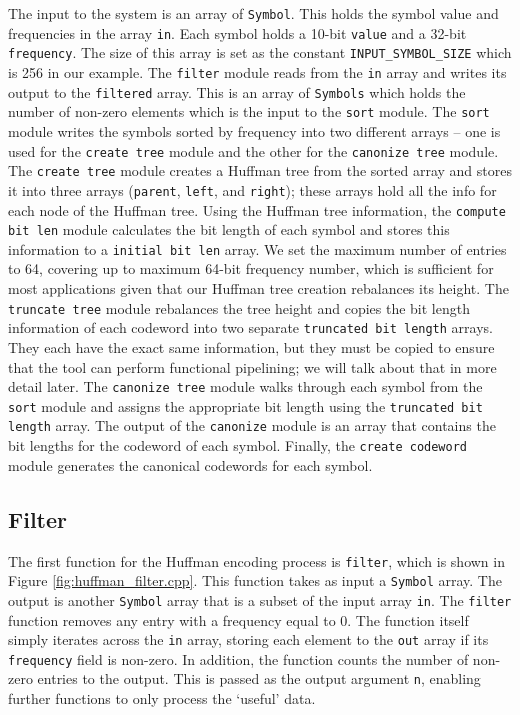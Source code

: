 The input to the system is an array of \lstinline{Symbol}. This holds the symbol value and frequencies in the array \lstinline{in}. Each symbol holds a 10-bit \lstinline{value} and a 32-bit \lstinline{frequency}. The size of this array is set as the constant \lstinline{INPUT_SYMBOL_SIZE} which is 256 in our example. The \lstinline{filter} module reads from the \lstinline{in} array and writes its output to the \lstinline{filtered} array. This is an array of \lstinline{Symbols} which holds the number of non-zero elements which is the input to the \lstinline{sort} module. The \lstinline{sort} module writes the symbols sorted by frequency into two different arrays -- one is used for the \lstinline{create tree} module and the other for the \lstinline{canonize tree} module. The \lstinline{create tree} module creates a Huffman tree from the sorted array and stores it into three arrays (\lstinline{parent}, \lstinline{left}, and \lstinline{right}); these arrays hold all the info for each node of the Huffman tree. Using the Huffman tree information, the \lstinline{compute bit len} module calculates the bit length of each symbol and stores this information to a \lstinline{initial bit len} array. We set the maximum number of entries to 64, covering up to maximum 64-bit frequency number, which is sufficient for most applications given that our Huffman tree creation rebalances its height. The \lstinline{truncate tree} module rebalances the tree height and copies the bit length information of each codeword into two separate \lstinline{truncated bit length} arrays. They each have the exact same information, but they must be copied to ensure that the \VHLS tool can perform functional pipelining; we will talk about that in more detail later. The \lstinline{canonize tree} module walks through each symbol from the \lstinline{sort} module and assigns the appropriate bit length using the \lstinline{truncated bit length} array. The output of the \lstinline{canonize} module is an array that contains the bit lengths for the codeword of each symbol. Finally, the \lstinline{create codeword} module generates the canonical codewords for each symbol.

\subsection{Filter}
 
The first function for the Huffman encoding process is \lstinline{filter}, which is shown in Figure \ref{fig:huffman_filter.cpp}. This function takes as input a \lstinline{Symbol} array. The output is another \lstinline{Symbol} array that is a subset of the input array \lstinline{in}. The \lstinline{filter} function removes any entry with a frequency equal to $0$.  The function itself simply iterates across the \lstinline{in} array, storing each element to the \lstinline{out} array if its \lstinline{frequency} field is non-zero. In addition, the function counts the number of non-zero entries to the output. This is passed as the output argument \lstinline{n}, enabling further functions to only process the `useful' data.

